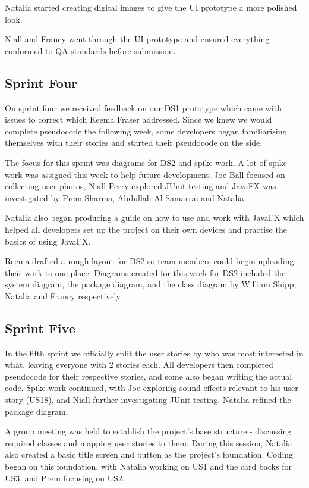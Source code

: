 \documentclass[a4paper]{project}
\begin{document}
			Natalia started creating digital images to give the UI prototype a more polished look.
			
			Niall and Francy went through the UI prototype and ensured everything conformed to QA standards before submission.
			
		\subsection{Sprint Four}\label{subsec:sprint-four}

			On sprint four we received feedback on our DS1 prototype which came with issues to correct which Reema Fraser addressed. Since we knew we would complete pseudocode the following week, some developers began familiarising themselves with their stories and started their pseudocode on the side.
		
			The focus for this sprint was diagrams for DS2 and spike work. A lot of spike work was assigned this week to help future development. Joe Ball focused on collecting user photos, Niall Perry explored JUnit testing and JavaFX was investigated by Prem Sharma, Abdullah Al-Samarrai and Natalia. 
		
			Natalia also began producing a guide on how to use and work with JavaFX which helped all developers set up the project on their own devices and practise the basics of using JavaFX. 
		
			Reema drafted a rough layout for DS2 so team members could begin uploading their work to one place. Diagrams created for this week for DS2 included the system diagram, the package diagram, and the class diagram by William Shipp, Natalia and Francy respectively.

		\subsection{Sprint Five}\label{subsec:sprint-five}

			In the fifth sprint we officially split the user stories by who was most interested in what, leaving everyone with 2 stories each. All developers then completed pseudocode for their respective stories, and some also began writing the actual code. Spike work continued, with Joe exploring sound effects relevant to his user story (US18), and Niall further investigating JUnit testing. Natalia refined the package diagram.
		
			A group meeting was held to establish the project’s base structure - discussing required classes and mapping user stories to them. During this session, Natalia also created a basic title screen and button as the project’s foundation. Coding began on this foundation, with Natalia working on US1 and the card backs for US3, and Prem focusing on US2.
\end{document}
